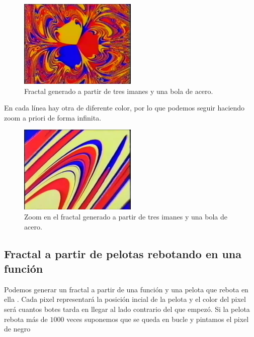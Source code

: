 \begin{figure}[H]
    \centering
    \includegraphics[width=0.5\textwidth]{figures/magnet-fractal.jpg}
    \caption{Fractal generado a partir de tres imanes y una bola de acero.}
    \label{fig:magnets-fractal}
\end{figure}

\noindent En cada línea hay otra de diferente color, por lo que podemos seguir haciendo zoom a priori de forma infinita.\\

\begin{figure}[H]
    \centering
    \includegraphics[width=0.5\textwidth]{figures/magnet-fractal-zoom.jpg}
    \caption{Zoom en el fractal generado a partir de tres imanes y una bola de acero.}
    \label{fig:magnets-fractal-zoom}
\end{figure}

\subsection{Fractal a partir de pelotas rebotando en una función}

\noindent Podemos generar un fractal a partir de una función y una pelota que rebota en ella \cite{balls}. Cada pixel representará la posición incial de la pelota y el color del pixel será cuantos botes tarda en llegar al lado contrario del que empezó. Si la pelota rebota más de $1000$ veces suponemos que se queda en bucle y pintamos el pixel de negro\\ 

